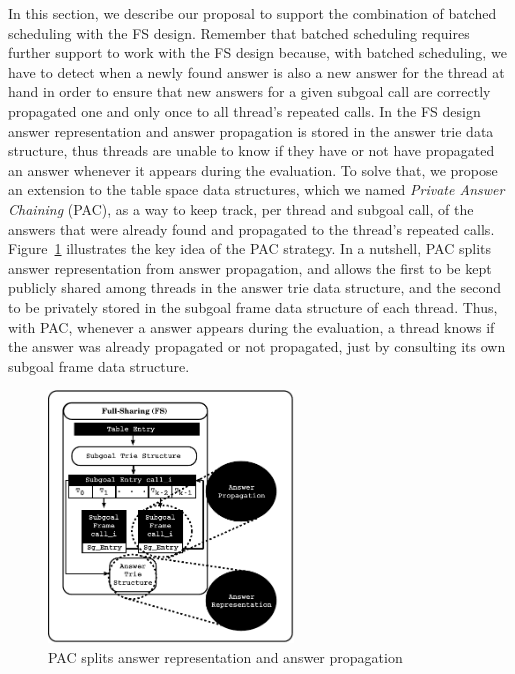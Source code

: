 \documentclass{llncs}
\begin{document}
In this section, we describe our proposal to support the combination
of batched scheduling with the FS design. Remember that batched
scheduling requires further support to work with the FS design
because, with batched scheduling, we have to detect when a newly found
answer is also a new answer for the thread at hand in order to ensure
that new answers for a given subgoal call are correctly propagated one
and only once to all thread’s repeated calls. In the FS design answer
representation and answer propagation is stored in the answer trie
data structure, thus threads are unable to know if they have or not
have propagated an answer whenever it appears during the
evaluation. To solve that, we propose an extension to the table space
data structures, which we named \emph{Private Answer Chaining} (PAC),
as a way to keep track, per thread and subgoal call, of the answers
that were already found and propagated to the thread's repeated
calls. Figure~\ref{fig_tabtries_pcc_key-idea} illustrates the key idea
of the PAC strategy. In a nutshell, PAC splits answer representation
from answer propagation, and allows the first to be kept publicly
shared among threads in the answer trie data structure, and the second
to be privately stored in the subgoal frame data structure of each
thread. Thus, with PAC, whenever a answer appears during the
evaluation, a thread knows if the answer was already propagated or not
propagated, just by consulting its own subgoal frame data structure.

\begin{figure}
\vspace{-\intextsep}
\centering
\includegraphics[width=6.5cm]{figures/pcc_key-idea.pdf}
\caption{PAC splits answer representation and answer propagation}
\label{fig_tabtries_pcc_key-idea}
\vspace{-0.5\intextsep}
\end{figure}
\end{document}
